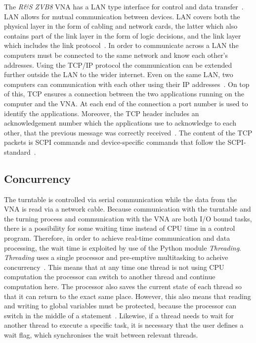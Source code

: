 The \textit{R\&S ZVB8} VNA has a LAN type interface for control and data transfer~\cite{vna_data_sheet_descrip}. LAN allows for mutual communication between devices. LAN covers both the physical layer in the form of cabling and network cards, the latter which also contains part of the link layer in the form of logic decisions, and the link layer which includes the link protocol~\cite[p. 153]{tcp_ip}. In order to communicate across a LAN the computers must be connected to the same network and know each other's addresses. Using the TCP/IP protocol the communication can be extended further outside the LAN to the wider internet. Even on the same LAN, two computers can communication with each other using their IP addresses~\cite[p. 174-175]{tcp_ip}. On top of this, TCP ensures a connection between the two applications running on the computer and the VNA. At each end of the connection a port number is used to identify the applications. Moreover, the TCP header includes an acknowledgement number which the applications use to acknowledge to each other, that the previous message was correctly received~\cite[p. 313]{tcp_ip}. The content of the TCP packets is SCPI commands and device-specific commands that follow the SCPI-standard~\cite[p. 5.4]{vna_operating_manual}.


\subsection{Concurrency}
The turntable is controlled via serial communication while the data from the VNA is read via a network cable. Because communication with the turntable and the turning process and communication with the VNA are both I/O bound tasks, there is a possibility for some waiting time instead of CPU time in a control program. Therefore, in order to achieve real-time communication and data processing, the wait time is exploited by use of the Python module \textit{Threading}. \textit{Threading} uses a single processor and pre-emptive multitasking to acheive concurrency~\cite{concurrency}. This means that at any time one thread is not using CPU computation the processor can switch to another thread and continue computation here. The processor also saves the current state of each thread so that it can return to the exact same place. However, this also means that reading and writing to global variables must be protected, because the processor can switch in the middle of a statement~\cite{concurrency}. Likewise, if a thread needs to wait for another thread to execute a specific task, it is necessary that the user defines a wait flag, which synchronises the wait between relevant threads.

